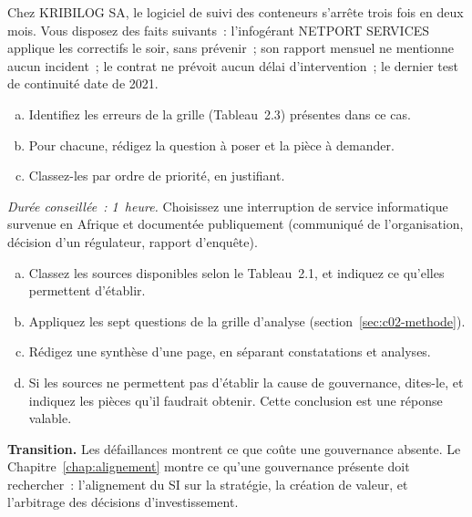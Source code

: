 \begin{boxexo}[title={\ding{45}\quad Exercice~2.2. La grille appliquée à KRIBILOG \niveaumoyen}]
Chez KRIBILOG SA, le logiciel de suivi des conteneurs s'arrête trois fois
en deux mois. Vous disposez des faits suivants~: l'infogérant NETPORT
SERVICES applique les correctifs le soir, sans prévenir~; son rapport
mensuel ne mentionne aucun incident~; le contrat ne prévoit aucun délai
d'intervention~; le dernier test de continuité date de 2021.
\begin{enumerate}[(a)]
    \item Identifiez les erreurs de la grille (Tableau~2.3) présentes dans
          ce cas.
    \item Pour chacune, rédigez la question à poser et la pièce à
          demander.
    \item Classez-les par ordre de priorité, en justifiant.
\end{enumerate}
\end{boxexo}

\begin{boxexo}[title={\ding{45}\quad Exercice~2.3. Simulation d'examen \niveauexpert}]
\textit{Durée conseillée~: 1~heure.} Choisissez une interruption de service
informatique survenue en Afrique et documentée publiquement (communiqué de
l'organisation, décision d'un régulateur, rapport d'enquête).
\begin{enumerate}[(a)]
    \item Classez les sources disponibles selon le Tableau~2.1, et
          indiquez ce qu'elles permettent d'établir.
    \item Appliquez les sept questions de la grille d'analyse
          (section~\ref{sec:c02-methode}).
    \item Rédigez une synthèse d'une page, en séparant constatations et
          analyses.
    \item Si les sources ne permettent pas d'établir la cause de
          gouvernance, dites-le, et indiquez les pièces qu'il faudrait
          obtenir. Cette conclusion est une réponse valable.
\end{enumerate}
\end{boxexo}

\bigskip

\begin{boxinfo}
\textbf{Transition.} Les défaillances montrent ce que coûte une
gouvernance absente. Le Chapitre~\ref{chap:alignement} montre ce qu'une
gouvernance présente doit rechercher~: l'alignement du SI sur la
stratégie, la création de valeur, et l'arbitrage des décisions
d'investissement.
\end{boxinfo}
